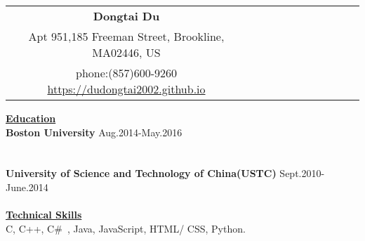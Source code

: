 \documentclass{resume} %
\begin{document}
 \small
\begin{spacing}{1}
\vspace{-0.5in}

\begin{center}
\begin{tabular}{*{11}{c}}
    \vspace{-0.5pt}
    \textbf{\Huge{Dongtai Du}}\\
    {\footnotesize Apt 951,185 Freeman Street, Brookline, MA02446, US} \\
    {\footnotesize phone:(857)600-9260} \hspace{1cm} {\footnotesize \url{https://dudongtai2002.github.io}}\hspace{1cm}{\footnotesize \url{Email:dudongtai2002@gmail.com}} \\
\end{tabular}

\uline{{\bf{\LARGE Education}}\hfill{\hspace{15cm}{}}} \\
\vspace{1mm}
{\bf Boston University \hspace{3cm} } \hfill {\hspace{2cm}Aug.2014-May.2016} \\
\hspace{3cm}
\\
\hspace{5.2cm}{Advanced Data Structure, Cloud Computing, Machine Learning}\\
{\bf University of Science and Technology of China(USTC) \hspace{1.8cm} } \hfill {Sept.2010-June.2014} \\
\hspace{-17.2cm}{B.S. in Physics} \hspace{1.66cm}\\

\vspace{3mm}
\uline{{\bf{\LARGE Technical Skills}}\hfill{\hspace{10cm}{}}} \\
\vspace{1mm}
\hspace{-6.0cm}{\bf Languages:} \hspace{2cm} {C, C++,  C\#\ , Java, JavaScript, HTML/ CSS, Python.} \\



\end{center}
\end{spacing}
\end{document}

